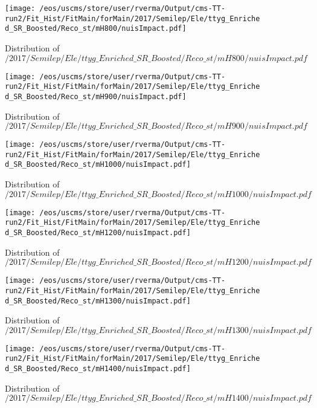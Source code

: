 \begin{figure}
\centering
\texttt{[image: /eos/uscms/store/user/rverma/Output/cms-TT-run2/Fit\_Hist/FitMain/forMain/2017/Semilep/Ele/ttyg\_Enriched\_SR\_Boosted/Reco\_st/mH800/nuisImpact.pdf]}
\caption{Distribution of $/2017/Semilep/Ele/ttyg\_Enriched\_SR\_Boosted/Reco\_st/mH800/nuisImpact.pdf$}
\end{figure}

\begin{figure}
\centering
\texttt{[image: /eos/uscms/store/user/rverma/Output/cms-TT-run2/Fit\_Hist/FitMain/forMain/2017/Semilep/Ele/ttyg\_Enriched\_SR\_Boosted/Reco\_st/mH900/nuisImpact.pdf]}
\caption{Distribution of $/2017/Semilep/Ele/ttyg\_Enriched\_SR\_Boosted/Reco\_st/mH900/nuisImpact.pdf$}
\end{figure}

\begin{figure}
\centering
\texttt{[image: /eos/uscms/store/user/rverma/Output/cms-TT-run2/Fit\_Hist/FitMain/forMain/2017/Semilep/Ele/ttyg\_Enriched\_SR\_Boosted/Reco\_st/mH1000/nuisImpact.pdf]}
\caption{Distribution of $/2017/Semilep/Ele/ttyg\_Enriched\_SR\_Boosted/Reco\_st/mH1000/nuisImpact.pdf$}
\end{figure}

\begin{figure}
\centering
\texttt{[image: /eos/uscms/store/user/rverma/Output/cms-TT-run2/Fit\_Hist/FitMain/forMain/2017/Semilep/Ele/ttyg\_Enriched\_SR\_Boosted/Reco\_st/mH1200/nuisImpact.pdf]}
\caption{Distribution of $/2017/Semilep/Ele/ttyg\_Enriched\_SR\_Boosted/Reco\_st/mH1200/nuisImpact.pdf$}
\end{figure}

\begin{figure}
\centering
\texttt{[image: /eos/uscms/store/user/rverma/Output/cms-TT-run2/Fit\_Hist/FitMain/forMain/2017/Semilep/Ele/ttyg\_Enriched\_SR\_Boosted/Reco\_st/mH1300/nuisImpact.pdf]}
\caption{Distribution of $/2017/Semilep/Ele/ttyg\_Enriched\_SR\_Boosted/Reco\_st/mH1300/nuisImpact.pdf$}
\end{figure}

\begin{figure}
\centering
\texttt{[image: /eos/uscms/store/user/rverma/Output/cms-TT-run2/Fit\_Hist/FitMain/forMain/2017/Semilep/Ele/ttyg\_Enriched\_SR\_Boosted/Reco\_st/mH1400/nuisImpact.pdf]}
\caption{Distribution of $/2017/Semilep/Ele/ttyg\_Enriched\_SR\_Boosted/Reco\_st/mH1400/nuisImpact.pdf$}
\end{figure}


